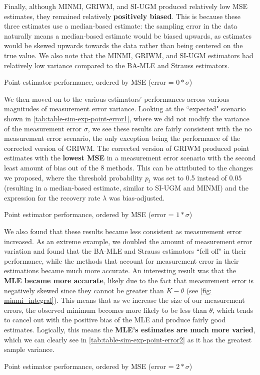 Finally, although MINMI, GRIWM, and SI-UGM produced relatively low MSE estimates, they remained relatively \textbf{positively biased}. This is because these three estimates use a median-based estimate: the sampling error in the data naturally means a median-based estimate would be biased upwards, as estimates would be skewed upwards towards the data rather than being centered on the true value. We also note that the MINMI, GRIWM, and SI-UGM estimators had relatively low variance compared to the BA-MLE and Strauss estimators.
\begin{table}[ht]
    \centering
    \caption{Point estimator performance, ordered by MSE (error = $0*\sigma$)}
    
    \label{tab:table-sim-exp-point-error0}
\end{table}

We then moved on to the various estimators' performances across various magnitudes of measurement error variance. Looking at the ``expected" scenario shown in \autoref{tab:table-sim-exp-point-error1}, where we did not modify the variance of the measurement error $\sigma$, we see these results are fairly consistent with the no measurement error scenario, the only exception being the performance of the corrected version of GRIWM. The corrected version of GRIWM produced point estimates with the \textbf{lowest MSE} in a measurement error scenario with the second least amount of bias out of the 8 methods. This can be attributed to the changes we proposed, where the threshold probability $p_t$ was set to 0.5 instead of $0.05$ (resulting in a median-based estimate, similar to SI-UGM and MINMI) and the expression for the recovery rate $\lambda$ was bias-adjusted.
\begin{table}[ht]
    \centering
    \caption{Point estimator performance, ordered by MSE (error = $1*\sigma$)}
    
    \label{tab:table-sim-exp-point-error1}
\end{table}

We also found that these results became less consistent as measurement error increased. As an extreme example, we doubled the amount of measurement error variation and found that the BA-MLE and Strauss estimators ``fell off" in their performance, while the methods that account for measurement error in their estimations became much more accurate. An interesting result was that the \textbf{MLE became more accurate}, likely due to the fact that measurement error is negatively skewed since they cannot be greater than $K-\theta$ (see \autoref{fig: minmi_integral}). This means that as we increase the size of our measurement errors, the observed minimum becomes more likely to be less than $\theta$, which tends to cancel out with the positive bias of the MLE and produce fairly good estimates. Logically, this means the \textbf{MLE's estimates are much more varied}, which we can clearly see in \autoref{tab:table-sim-exp-point-error2} as it has the greatest sample variance.
\begin{table}[ht]
    \centering
    \caption{Point estimator performance, ordered by MSE (error = $2*\sigma$)}
    
    \label{tab:table-sim-exp-point-error2}
\end{table}

